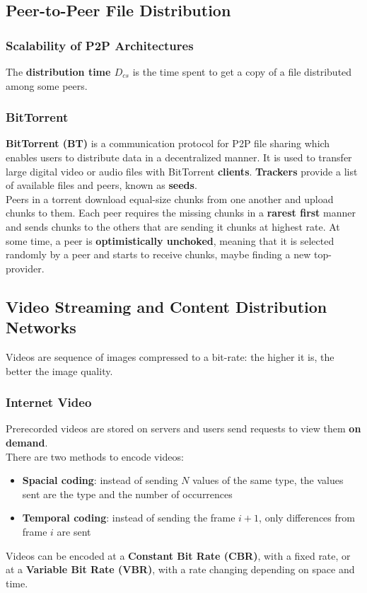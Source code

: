 \documentclass{article}
\begin{document}
\subsection{Peer-to-Peer File Distribution}
\subsubsection{Scalability of P2P Architectures}
The \textbf{distribution time $ D_{cs} $} is the time spent to get a copy of a file distributed among some peers.
\subsubsection*{BitTorrent}
\textbf{BitTorrent (BT)} is a communication protocol for P2P file sharing which enables users to distribute data in a decentralized manner. It is used to transfer large digital video or audio files with BitTorrent \textbf{clients}.
\textbf{Trackers} provide a list of available files and peers, known as \textbf{seeds}. \\
Peers in a torrent download equal-size chunks from one another and upload chunks to them. Each peer requires the missing chunks in a \textbf{rarest first} manner and sends chunks to the others that are sending it chunks at highest rate. At some time, a peer is \textbf{optimistically unchoked}, meaning that it is selected randomly by a peer and starts to receive chunks, maybe finding a new top-provider.

\subsection{Video Streaming and Content Distribution Networks}
Videos are sequence of images compressed to a bit-rate: the higher it is, the better the image quality. \\
\subsubsection{Internet Video}
Prerecorded videos are stored on servers and users send requests to view them \textbf{on demand}. \\
There are two methods to encode videos:
\begin{itemize}
    \item \textbf{Spacial coding}: instead of sending $ N $ values of the same type, the values sent are the type and the number of occurrences 
    \item \textbf{Temporal coding}: instead of sending the frame $ i + 1 $, only differences from frame $ i $ are sent
\end{itemize}
Videos can be encoded at a \textbf{Constant Bit Rate (CBR)}, with a fixed rate, or at a \textbf{Variable Bit Rate (VBR)}, with a rate changing depending on space and time.
\end{document}

